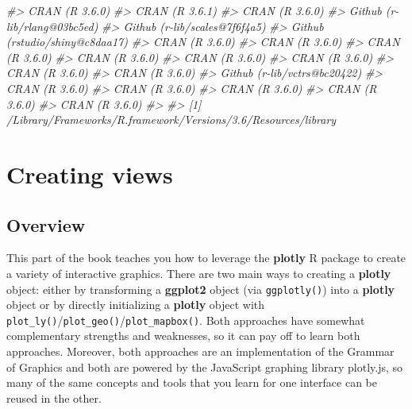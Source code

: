 \documentclass[
  12pt,
]{krantz}
\newenvironment{Shaded}{\begin{snugshade}}{\end{snugshade}}
\newcommand{\CommentTok}[1]{\textcolor[rgb]{0.56,0.35,0.01}{\textit{#1}}}
\begin{document}
\begin{Shaded}
\begin{Highlighting}[]
\CommentTok{#>  CRAN (R 3.6.0)                       }
\CommentTok{#>  CRAN (R 3.6.1)                       }
\CommentTok{#>  CRAN (R 3.6.0)                       }
\CommentTok{#>  Github (r-lib/rlang@03bc5ed)         }
\CommentTok{#>  Github (r-lib/scales@7f6f4a5)        }
\CommentTok{#>  Github (rstudio/shiny@c8daa17)       }
\CommentTok{#>  CRAN (R 3.6.0)                       }
\CommentTok{#>  CRAN (R 3.6.0)                       }
\CommentTok{#>  CRAN (R 3.6.0)                       }
\CommentTok{#>  CRAN (R 3.6.0)                       }
\CommentTok{#>  CRAN (R 3.6.0)                       }
\CommentTok{#>  CRAN (R 3.6.0)                       }
\CommentTok{#>  CRAN (R 3.6.0)                       }
\CommentTok{#>  CRAN (R 3.6.0)                       }
\CommentTok{#>  Github (r-lib/vctrs@bc20422)         }
\CommentTok{#>  CRAN (R 3.6.0)                       }
\CommentTok{#>  CRAN (R 3.6.0)                       }
\CommentTok{#>  CRAN (R 3.6.0)                       }
\CommentTok{#>  CRAN (R 3.6.0)                       }
\CommentTok{#>  CRAN (R 3.6.0)                       }
\CommentTok{#> }
\CommentTok{#> [1] /Library/Frameworks/R.framework/Versions/3.6/Resources/library}
\end{Highlighting}
\end{Shaded}

\hypertarget{part-creating-views}{%
\part{Creating views}\label{part-creating-views}}

\hypertarget{overview}{%
\chapter{Overview}\label{overview}}

This part of the book teaches you how to leverage the \textbf{plotly} R package to create a variety of interactive graphics. There are two main ways to creating a \textbf{plotly} object: either by transforming a \textbf{ggplot2} object (via \texttt{ggplotly()}) into a \textbf{plotly} object or by directly initializing a \textbf{plotly} object with \texttt{plot\_ly()}/\texttt{plot\_geo()}/\texttt{plot\_mapbox()}. Both approaches have somewhat complementary strengths and weaknesses, so it can pay off to learn both approaches. Moreover, both approaches are an implementation of the Grammar of Graphics and both are powered by the JavaScript graphing library plotly.js, so many of the same concepts and tools that you learn for one interface can be reused in the other.
\end{document}
